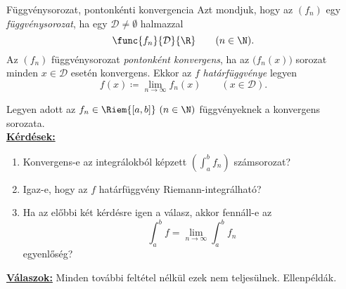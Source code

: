 \documentclass[
]{elteikthesis}[2024/04/26]
\begin{document}
	\begin{definition}{Függvénysorozat, pontonkénti konvergencia}{}
		Azt mondjuk, hogy az \( (f_n) \) egy \emph{függvénysorozat}, 
		ha egy \( \mathcal{D} \neq \emptyset \) halmazzal
		\[
			\func{f_n}{\mathcal{D}}{\R} \qquad (n \in \N).
		\]
		Az \( (f_n) \) függvénysorozat \emph{pontonként konvergens}, 
		ha az \( \bigl( f_n(x) \bigr) \) sorozat minden \( x \in \mathcal{D} \) esetén konvergens. 
		Ekkor az \( f \) \emph{határfüggvénye} legyen
		\[
			f(x) \coloneq \lim_{n \to \infty} f_n(x) \qquad (x \in \mathcal{D}).
		\]
	\end{definition}
	
%		
	
	\noindent 
	Legyen adott az \( f_n \in \Riem{[a, b]} \ (n \in \N) \) függvényeknek a konvergens sorozata.\\
	
	\noindent
	\underline{\textbf{Kérdések:}}
	
	\begin{enumerate}[label=\arabic*.]
		\item\label{eq:kérdések-01}
		Konvergens-e az integrálokból képzett \( \left( \int_a^b f_n \right) \) számsorozat?
		
		\item\label{eq:kérdések-02}
		Igaz-e, hogy az \( f \) határfüggvény Riemann-integrálható?
		
		\item\label{eq:kérdések-03}
		Ha az előbbi két kérdésre igen a válasz, akkor fennáll-e az
		\[
			\int_a^b f = \lim_{n \to \infty} \int_a^b f_n
		\]
		egyenlőség?
	\end{enumerate}
	
	\noindent
	\underline{\textbf{Válaszok:}} Minden további feltétel nélkül ezek nem teljesülnek.
	Ellenpéldák.
	
\end{document}
